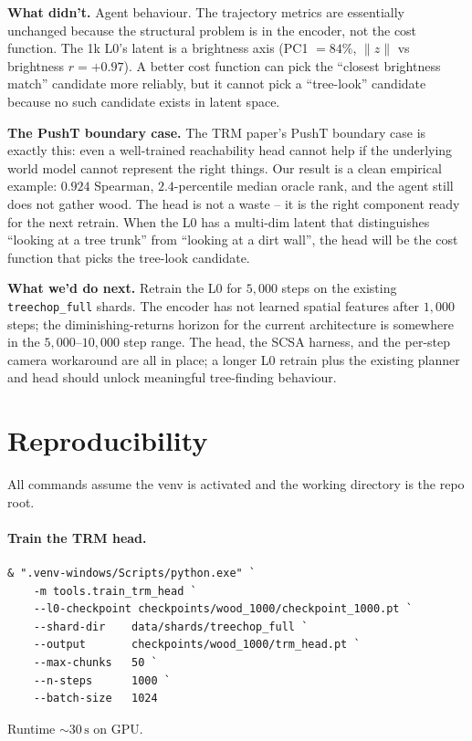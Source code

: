 \documentclass[11pt]{article}
\begin{document}
\textbf{What didn't.} Agent behaviour. The trajectory metrics
are essentially unchanged because the structural problem is in
the encoder, not the cost function. The 1k L0's latent is a
brightness axis (PC1 $= 84\%$, $\|z\|$ vs brightness $r=+0.97$).
A better cost function can pick the ``closest brightness match''
candidate more reliably, but it cannot pick a ``tree-look''
candidate because no such candidate exists in latent space.

\textbf{The PushT boundary case.} The TRM paper's
PushT boundary case is exactly this: even a well-trained
reachability head cannot help if the underlying world model
cannot represent the right things. Our result is a clean
empirical example: $0.924$ Spearman, $2.4$-percentile median
oracle rank, and the agent still does not gather wood. The
head is not a waste -- it is the right component ready for the
next retrain. When the L0 has a multi-dim latent that
distinguishes ``looking at a tree trunk'' from ``looking at a
dirt wall'', the head will be the cost function that picks the
tree-look candidate.

\textbf{What we'd do next.} Retrain the L0 for $5{,}000$ steps
on the existing \texttt{treechop\_full} shards. The encoder has
not learned spatial features after $1{,}000$ steps; the
diminishing-returns horizon for the current architecture is
somewhere in the $5{,}000$--$10{,}000$ step range. The head,
the SCSA harness, and the per-step camera workaround are all in
place; a longer L0 retrain plus the existing planner and head
should unlock meaningful tree-finding behaviour.

\section{Reproducibility}
\label{sec:repro}

All commands assume the venv is activated and the working
directory is the repo root.

\paragraph{Train the TRM head.}
\begin{verbatim}
& ".venv-windows/Scripts/python.exe" `
    -m tools.train_trm_head `
    --l0-checkpoint checkpoints/wood_1000/checkpoint_1000.pt `
    --shard-dir    data/shards/treechop_full `
    --output       checkpoints/wood_1000/trm_head.pt `
    --max-chunks   50 `
    --n-steps      1000 `
    --batch-size   1024
\end{verbatim}
Runtime $\sim 30\,\mathrm{s}$ on GPU.
\end{document}
